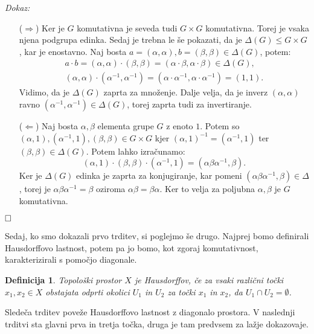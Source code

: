 \documentclass[a4paper,12pt]{article}
\def\qed{$\hfill\Box$}   %
\newtheorem{definicija}{Definicija}
\begin{document}
\noindent
{\em Dokaz:\/}
    \begin{itemize}
        \item[($\Rightarrow$)] Ker je $G$ komutativna je seveda tudi $G \times G$ komutativna. Torej je vsaka njena podgrupa edinka.
            Sedaj je trebna le še pokazati, da je $\Delta(G) \le G \times G$, kar je enostavno. Naj bosta $a = (\alpha, \alpha), b = (\beta, \beta) \in \Delta(G)$, potem:
            \begin{gather*}
                a \cdot b = (\alpha, \alpha) \cdot (\beta, \beta) = (\alpha \cdot \beta, \alpha \cdot \beta) \in \Delta(G), \\
                (\alpha, \alpha) \cdot (\alpha^{-1}, \alpha^{-1}) = (\alpha \cdot \alpha^{-1}, \alpha \cdot \alpha^{-1}) = (1,1).
            \end{gather*}
            Vidimo, da je $\Delta(G)$ zaprta za množenje. Dalje velja, da je inverz $(\alpha, \alpha)$ ravno $(\alpha^{-1}, \alpha^{-1}) \in \Delta(G)$, torej zaprta tudi za invertiranje.
        \item[($\Leftarrow$)] Naj bosta $\alpha, \beta$ elementa grupe $G$ z enoto $1$.
        Potem so $(\alpha,1), (\alpha^{-1}, 1), (\beta, \beta) \in G \times G$ kjer
            $(\alpha,1)^{-1} = (\alpha^{-1},1)$ ter $(\beta, \beta) \in \Delta(G)$. Potem lahko izračunamo:
            \[(\alpha,1) \cdot (\beta, \beta) \cdot (\alpha^{-1}, 1) = (\alpha\beta\alpha^{-1}, \beta).\]
            Ker je $\Delta(G)$ edinka je zaprta za konjugiranje, kar pomeni $(\alpha\beta\alpha^{-1}, \beta) \in \Delta$,
            torej je $\alpha\beta\alpha^{-1} = \beta$ oziroma $\alpha\beta = \beta\alpha$. Ker to velja za poljubna $\alpha, \beta$ je $G$ komutativna.
    \end{itemize}
\qed

Sedaj, ko smo dokazali prvo trditev, si poglejmo še drugo. Najprej bomo definirali Hausdorffovo lastnost, potem pa jo bomo, kot zgoraj komutativnost, karakterizirali s pomočjo diagonale. 

\begin{definicija}
    Topološki prostor $X$ je \emph{Hausdorffov}, če za vsaki različni točki $x_1, x_2 \in X$ obstajata odprti okolici $U_1$ in $U_2$ za točki $x_1$ in $x_2$, da $U_1 \cap U_2 = \emptyset$.
\end{definicija}

Sledeča trditev poveže Hausdorffovo lastnost z diagonalo prostora.
V naslednji trditvi sta glavni prva in tretja točka, druga je tam predvsem za lažje dokazovaje.
\end{document}
